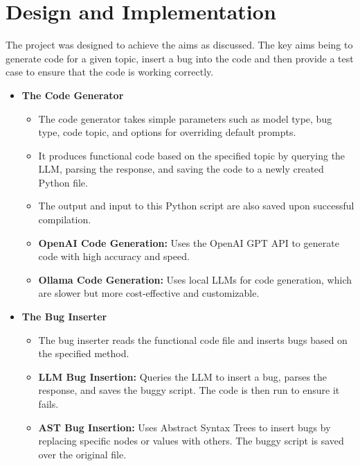 \documentclass[12pt]{extarticle}
\begin{document}
\newpage
\section{Design and Implementation}

The project was designed to achieve the aims as discussed. The key aims being to generate code for a given topic, insert a bug into the code and then provide a test case to ensure that the code is working correctly. 

\begin{itemize}
    \item \textbf{The Code Generator}
    \begin{itemize}
        \item The code generator takes simple parameters such as model type, bug type, code topic, and options for overriding default prompts.
        \item It produces functional code based on the specified topic by querying the LLM, parsing the response, and saving the code to a newly created Python file.
        \item The output and input to this Python script are also saved upon successful compilation.
        \item \textbf{OpenAI Code Generation:} Uses the OpenAI GPT API to generate code with high accuracy and speed.
        \item \textbf{Ollama Code Generation:} Uses local LLMs for code generation, which are slower but more cost-effective and customizable.
    \end{itemize}

    \item \textbf{The Bug Inserter}
    \begin{itemize}
        \item The bug inserter reads the functional code file and inserts bugs based on the specified method.
        \item \textbf{LLM Bug Insertion:} Queries the LLM to insert a bug, parses the response, and saves the buggy script. The code is then run to ensure it fails.
        \item \textbf{AST Bug Insertion:} Uses Abstract Syntax Trees to insert bugs by replacing specific nodes or values with others. The buggy script is saved over the original file.
    \end{itemize}


\end{itemize}
\end{document}
